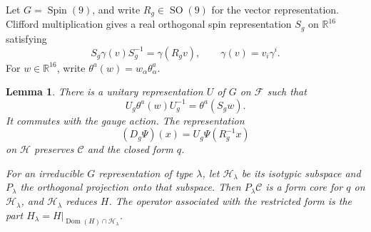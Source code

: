 \documentclass[11pt]{amsart}
\newcommand{\R}{\mathbb R}
\newcommand{\F}{\mathcal F}
\newcommand{\Core}{\mathcal C}
\newcommand{\Hphys}{\mathcal H}
\newcommand{\Spin}{\operatorname{Spin}}
\newcommand{\SO}{\operatorname{SO}}
\newcommand{\Dom}{\operatorname{Dom}}
\newtheorem{lemma}[theorem]{Lemma}
\theoremstyle{remark}
\numberwithin{equation}{section}
\begin{document}
Let $G=\Spin(9)$, and write $R_g\in\SO(9)$ for the vector
representation. Clifford multiplication gives a real orthogonal spin
representation $S_g$ on $\R^{16}$ satisfying
\begin{equation}
 S_g\gamma(v)S_g^{-1}=\gamma(R_gv),
 \qquad \gamma(v)=v_i\gamma^i.
 \label{eq:gamma-covariance}
\end{equation}
For $w\in\R^{16}$, write
$\theta^a(w)=w_\alpha\theta_\alpha^a$.

\begin{lemma}
\label{lem:rotations}
There is a unitary representation $U$ of $G$ on $\F$ such that
\[
 U_g\theta^a(w)U_g^{-1}=\theta^a(S_gw).
\]
It commutes with the gauge action. The representation
\begin{equation}
 (D_g\Psi)(x)=U_g\Psi(R_g^{-1}x)
 \label{eq:rotation-action}
\end{equation}
on $\Hphys$ preserves $\Core$ and the closed form $q$.

For an irreducible $G$ representation of type $\lambda$, let
$\Hphys_\lambda$ be its isotypic subspace and $P_\lambda$ the
orthogonal projection onto that subspace. Then $P_\lambda\Core$ is a
form core for $q$ on $\Hphys_\lambda$, and $\Hphys_\lambda$ reduces
$H$. The operator associated with the restricted form is the part
$H_\lambda=H|_{\Dom(H)\cap\Hphys_\lambda}$.
\end{lemma}
\end{document}
